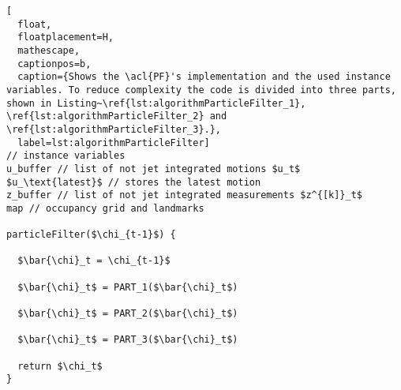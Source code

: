 \begin{lstlisting}[
  float,
  floatplacement=H,
  mathescape,
  captionpos=b,
  caption={Shows the \acl{PF}'s implementation and the used instance variables. To reduce complexity the code is divided into three parts, shown in Listing~\ref{lst:algorithmParticleFilter_1}, \ref{lst:algorithmParticleFilter_2} and \ref{lst:algorithmParticleFilter_3}.},
  label=lst:algorithmParticleFilter]
// instance variables
u_buffer // list of not jet integrated motions $u_t$
$u_\text{latest}$ // stores the latest motion
z_buffer // list of not jet integrated measurements $z^{[k]}_t$
map // occupancy grid and landmarks

particleFilter($\chi_{t-1}$) {

  $\bar{\chi}_t = \chi_{t-1}$

  $\bar{\chi}_t$ = PART_1($\bar{\chi}_t$)

  $\bar{\chi}_t$ = PART_2($\bar{\chi}_t$)

  $\bar{\chi}_t$ = PART_3($\bar{\chi}_t$)

  return $\chi_t$
}
\end{lstlisting}
